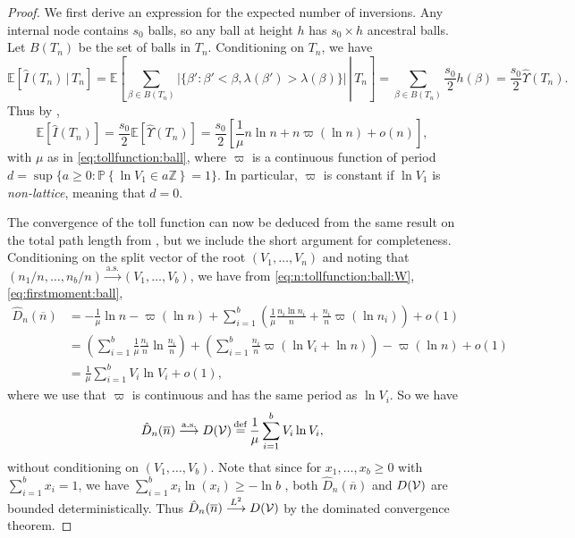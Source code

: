\documentclass[11pt]{article}
\newcommand{\E}[1]{\mathbb{E} \left[#1\right]}
\newcommand{\ball}[1]{\hat{#1}}
\def\bI{\ball{I}}
\def\bU{\ball{\Upsilon}}
\newcommand\cV{{\cal V}}
\def\Z{\mathbb{Z}}
\def\b{\beta}
\def\l{\lambda}
\def\m{\mu}
\newcommand\Prob[1]{{\mathbb{P}\left\{#1\right\}}}
\numberwithin{theorem}{section}
\theoremstyle{definition}
\newcommand{\inas}{\asto} %
\newcommand{\inLII}{\overset{L^{2}}{\too}}
\newcommand{\eqd}{\,{\buildrel {\mathrm{def}} \over =}\,}
\newcommand{\nBar}{\overline{n}}
\newcommand{\Toll}{D}
\newcommand{\bToll}{\ball{\Toll}}
\newcommand{\bTollN}{\bToll_{n}}
\numberwithin{equation}{section}
\newcommand{\too}{\longrightarrow}
\newcommand\asto{\overset{\mathrm{a.s.}}{\too}}
\begin{document}
\begin{proof}
We first derive an expression for the expected number of
inversions. Any internal node contains $s_0$ balls, so any ball at height $h$ has $s_0 \times h$ ancestral
balls. Let \(B(T_n)\) be the set of balls in \(T_n\).
Conditioning on \(T_n\), we have
$$
\E{\bI(T_n)\,|\,T_n} 
= \E{\left. \sum_{\b\in B(T_n)} |\{\b' : \b' < \b, \l(\b') > \l(\b)\}| \, \right| \, T_n} 
= \sum_{\b \in B(T_n)} \frac{s_0}{2} h(\b) 
= \frac{s_0}{2} \bU(T_n).
$$
Thus by \citet[Theorem 3.1]{MR3025680},
\begin{equation}\label{eq:firstmoment:ball}
\E{\bI(T_n)}
=
\frac{s_0}{2}
\E{\bU(T_n)} 
= 
\frac{s_0}{2}
\left[
\frac1\m n\ln n + n\varpi(\ln n) + o(n)
\right]
,
\end{equation}
with $\m$ as in \eqref{eq:tollfunction:ball}, where $\varpi$ is a continuous function of period $d = \sup\{a
\geq 0 : \Prob{\ln V_1 \in a\Z} = 1\}$. In particular, $\varpi$ is constant if $\ln V_1$ is {\em non-lattice}, meaning that \(d = 0\).

The convergence of the toll function can now be deduced from the same result on the total path length
from \cite{MR3025680}, but we include the short argument for completeness. Conditioning on the split
vector of the root $(V_1,\dots,V_n)$ and noting that $(n_1/n,\dots,n_b/n) \inas (V_1,\dots,V_b)$, we
have from \eqref{eq:n:tollfunction:ball:W}, \eqref{eq:firstmoment:ball},
\begin{align}
    \bTollN(\nBar) 
    & = - \frac{1}{\m} \ln n - \varpi(\ln n) + \sum_{i=1}^b \left( \frac{1}{\m} \frac{n_i\ln n_i}{n} + \frac{n_i}{n} \varpi(\ln n_i) \right) + o(1) \\
    & = \left(\sum_{i=1}^b \frac{1}{\m} \frac{n_i}{n}\ln\frac{n_i}{n} \right) + \left(\sum_{i=1}^b \frac{n_i}{n} \varpi\left( \ln V_i + \ln n \right)\right) -
        \varpi(\ln n)
        + o(1) \\
    & = \frac{1}{\m} \sum_{i=1}^b V_i\ln V_i + o(1),
\end{align}
where we use that \(\varpi\) is continuous and has the same period as \(\ln V_i\).
So we have
$$
\bTollN(\nBar) \inas \Toll(\cV) \eqd \frac{1}{\m} \sum_{i=1}^b V_i\ln V_i,
$$
without conditioning on $(V_1,\dots,V_b)$. Note that since for \(x_1,\dots,x_b \ge 0\) with
    \(\sum_{i=1}^b x_i = 1\), we have
\(
    \sum_{i=1}^b x_i \ln(x_i) \ge - \ln b
\) \cite[Theorem 3.1]{conrad2017},
both \(\bTollN(\nBar)\) and \(\Toll(\cV)\) are bounded deterministically.
Thus \(\bTollN(\nBar) \inLII \Toll(\cV)\) by the dominated convergence
theorem.
\end{proof}
\end{document}
